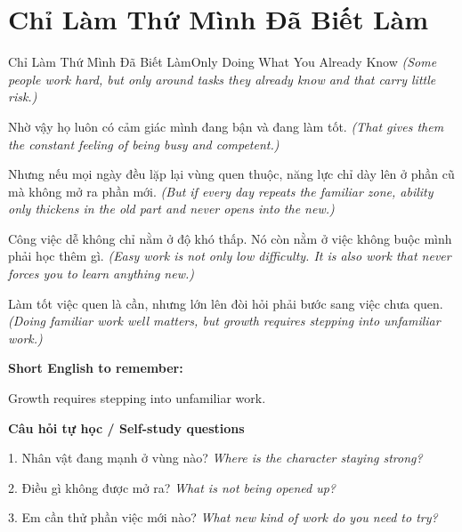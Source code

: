 \section{Chỉ Làm Thứ Mình Đã Biết Làm}
\begin{truyen}{Chỉ Làm Thứ Mình Đã Biết Làm}{Only Doing What You Already Know}
\textit{(Some people work hard, but only around tasks they already know and that carry little risk.)}

Nhờ vậy họ luôn có cảm giác mình đang bận và đang làm tốt.
\textit{(That gives them the constant feeling of being busy and competent.)}

Nhưng nếu mọi ngày đều lặp lại vùng quen thuộc, năng lực chỉ dày lên ở phần cũ mà không mở ra phần mới.
\textit{(But if every day repeats the familiar zone, ability only thickens in the old part and never opens into the new.)}

Công việc dễ không chỉ nằm ở độ khó thấp. Nó còn nằm ở việc không buộc mình phải học thêm gì.
\textit{(Easy work is not only low difficulty. It is also work that never forces you to learn anything new.)}

\end{truyen}

\begin{baihoc}
Làm tốt việc quen là cần, nhưng lớn lên đòi hỏi phải bước sang việc chưa quen.
\textit{(Doing familiar work well matters, but growth requires stepping into unfamiliar work.)}
\end{baihoc}

\begin{ghinhoanh}
\textbf{Short English to remember:}

Growth requires stepping into unfamiliar work.

\end{ghinhoanh}

\begin{tuhocnhanh}
\textbf{Câu hỏi tự học / Self-study questions}

1. Nhân vật đang mạnh ở vùng nào? \textit{Where is the character staying strong?}

2. Điều gì không được mở ra? \textit{What is not being opened up?}

3. Em cần thử phần việc mới nào? \textit{What new kind of work do you need to try?}
\end{tuhocnhanh}
\ngancach

